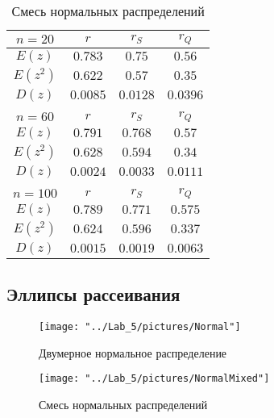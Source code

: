 \documentclass[12pt,a4paper]{article}
\begin{document}
\begin{center}
		\begin{table}[H]
			\begin{center}
				\begin{tabular}{|c|c|c|c|}
					\hline
					$n = 20$ & $r$ & $r_S$ & $r_Q$\\
					\hline
					$E(z)$ & $0.783$ & $0.75$ & $0.56$ \\
					\hline
					$E(z^2)$ & $0.622$ & $0.57$ & $0.35$ \\
					\hline
					$D(z)$ & $0.0085$ & $0.0128$ & $0.0396$ \\
					\hline
					\multicolumn{4}{c}{ } \\
					\hline
					$n = 60$ & $r$ & $r_S$ & $r_Q$\\
					\hline
					$E(z)$ & $0.791$ & $0.768$ & $0.57$ \\
					\hline
					$E(z^2)$ & $0.628$ & $0.594$ & $0.34$ \\
					\hline
					$D(z)$ & $0.0024$ & $0.0033$ & $0.0111$ \\
					\hline
					\multicolumn{4}{c}{ } \\
					\hline
					$n = 100$ & $r$ & $r_S$ & $r_Q$\\
					\hline
					$E(z)$ & $0.789$ & $0.771$ & $0.575$ \\
					\hline
					$E(z^2)$ & $0.624$ & $0.596$ & $0.337$ \\
					\hline
					$D(z)$ & $0.0015$ & $0.0019$ & $0.0063$ \\
					\hline					
				\end{tabular}
				\caption{Смесь нормальных распределений}
			\end{center}
		\end{table}
	\end{center}
	
	\newpage
	\subsection{Эллипсы рассеивания}
	\begin{center}
		\begin{figure}[H]
			\texttt{[image: "../Lab\_5/pictures/Normal"]} 
			\caption[Двумерное нормальное распределение]{Двумерное нормальное распределение}
		\end{figure}
		
		\begin{figure}[h!]
			\texttt{[image: "../Lab\_5/pictures/NormalMixed"]}
			\caption[Смесь нормальных распределений]{Смесь нормальных распределений}
		\end{figure}
	\end{center}
\end{document}
